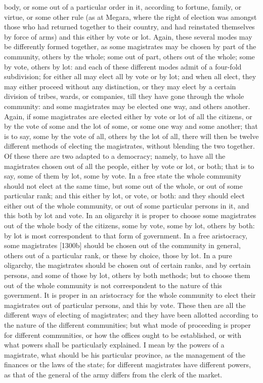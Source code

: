 body, or some out of a particular order in it, according to fortune,
family, or virtue, or some other rule (as at Megara, where the right of
election was amongst those who had returned together to their country, and
had reinstated themselves by force of arms) and this either by vote or
lot. Again, these several modes may be differently formed together, as
some magistrates may be chosen by part of the community, others by the
whole; some out of part, others out of the whole; some by vote, others by
lot: and each of these different modes admit of a four-fold subdivision;
for either all may elect all by vote or by lot; and when all elect, they
may either proceed without any distinction, or they may elect by a certain
division of tribes, wards, or companies, till they have gone through the
whole community: and some magistrates may be elected one way, and others
another. Again, if some magistrates are elected either by vote or lot of
all the citizens, or by the vote of some and the lot of some, or some one
way and some another; that is to say, some by the vote of all, others by
the lot of all, there will then be twelve different methods of electing
the magistrates, without blending the two together. Of these there are two
adapted to a democracy; namely, to have all the magistrates chosen out of
all the people, either by vote or lot, or both; that is to say, some of
them by lot, some by vote. In a free state the whole community should not
elect at the same time, but some out of the whole, or out of some
particular rank; and this either by lot, or vote, or both: and they should
elect either out of the whole community, or out of some particular persons
in it, and this both by lot and vote. In an oligarchy it is proper to
choose some magistrates out of the whole body of the citizens, some by
vote, some by lot, others by both: by lot is most correspondent to that
form of government. In a free aristocracy, some magistrates [1300b] should
be chosen out of the community in general, others out of a particular
rank, or these by choice, those by lot. In a pure oligarchy, the
magistrates should be chosen out of certain ranks, and by certain persons,
and some of those by lot, others by both methods; but to choose them out
of the whole community is not correspondent to the nature of this
government. It is proper in an aristocracy for the whole community to
elect their magistrates out of particular persons, and this by vote. These
then are all the different ways of electing of magistrates; and they have
been allotted according to the nature of the different communities; but
what mode of proceeding is proper for different communities, or how the
offices ought to be established, or with what powers shall be particularly
explained. I mean by the powers of a magistrate, what should be his
particular province, as the management of the finances or the laws of the
state; for different magistrates have different powers, as that of the
general of the army differs from the clerk of the market.

